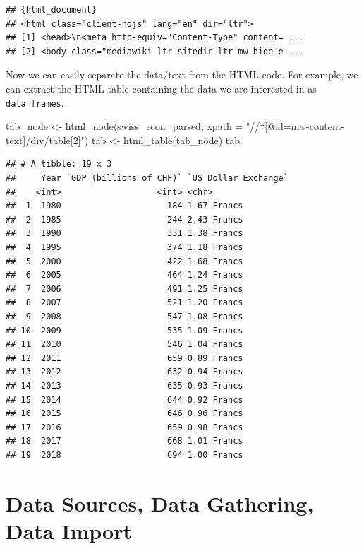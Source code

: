 \documentclass[
  12pt,
]{style/krantz}
\newenvironment{Shaded}{\begin{snugshade}}{\end{snugshade}}
\newcommand{\AttributeTok}[1]{\textcolor[rgb]{0.77,0.63,0.00}{#1}}
\newcommand{\FunctionTok}[1]{\textcolor[rgb]{0.00,0.00,0.00}{#1}}
\newcommand{\NormalTok}[1]{#1}
\newcommand{\OtherTok}[1]{\textcolor[rgb]{0.56,0.35,0.01}{#1}}
\newcommand{\StringTok}[1]{\textcolor[rgb]{0.31,0.60,0.02}{#1}}
\begin{document}
\begin{verbatim}
## {html_document}
## <html class="client-nojs" lang="en" dir="ltr">
## [1] <head>\n<meta http-equiv="Content-Type" content= ...
## [2] <body class="mediawiki ltr sitedir-ltr mw-hide-e ...
\end{verbatim}

Now we can easily separate the data/text from the HTML code. For example, we can extract the HTML table containing the data we are interested in as \texttt{data\ frames}.

\begin{Shaded}
\begin{Highlighting}[]
\NormalTok{tab\_node }\OtherTok{\textless{}{-}} \FunctionTok{html\_node}\NormalTok{(swiss\_econ\_parsed, }\AttributeTok{xpath =} \StringTok{"//*[@id=\textquotesingle{}mw{-}content{-}text\textquotesingle{}]/div/table[2]"}\NormalTok{)}
\NormalTok{tab }\OtherTok{\textless{}{-}} \FunctionTok{html\_table}\NormalTok{(tab\_node)}
\NormalTok{tab}
\end{Highlighting}
\end{Shaded}

\begin{verbatim}
## # A tibble: 19 x 3
##     Year `GDP (billions of CHF)` `US Dollar Exchange`
##    <int>                   <int> <chr>               
##  1  1980                     184 1.67 Francs         
##  2  1985                     244 2.43 Francs         
##  3  1990                     331 1.38 Francs         
##  4  1995                     374 1.18 Francs         
##  5  2000                     422 1.68 Francs         
##  6  2005                     464 1.24 Francs         
##  7  2006                     491 1.25 Francs         
##  8  2007                     521 1.20 Francs         
##  9  2008                     547 1.08 Francs         
## 10  2009                     535 1.09 Francs         
## 11  2010                     546 1.04 Francs         
## 12  2011                     659 0.89 Francs         
## 13  2012                     632 0.94 Francs         
## 14  2013                     635 0.93 Francs         
## 15  2014                     644 0.92 Francs         
## 16  2015                     646 0.96 Francs         
## 17  2016                     659 0.98 Francs         
## 18  2017                     668 1.01 Francs         
## 19  2018                     694 1.00 Francs
\end{verbatim}

\hypertarget{data-sources-data-gathering-data-import}{%
\chapter{Data Sources, Data Gathering, Data Import}\label{data-sources-data-gathering-data-import}}
\end{document}
